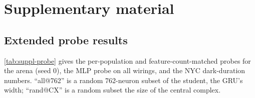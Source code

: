 \section{Supplementary material}

\subsection{Extended probe results}
\label{sec:suppl-probe}
\cref{tab:suppl-probe} gives the per-population and feature-count-matched probes for the arena (seed 0), the MLP
probe on all wirings, and the NYC dark-duration numbers. ``all@762'' is a random 762-neuron subset of the student,
the GRU's width; ``rand@CX'' is a random subset the size of the central complex.

\begin{table}[h]
  \centering\small
  \setlength{\tabcolsep}{3pt}
  \caption{Median heading error (\degree) in the 8:16 blind window, arena, seed 0 (MLP column: mean\pm sd over 3
  seeds). The EPG population alone carries almost no heading; the central complex decodes no better than a random
  subset of its size.}
  \label{tab:suppl-probe}
\end{table}

